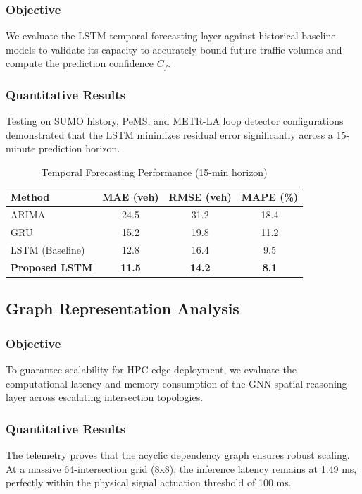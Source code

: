 \subsubsection{Objective}
We evaluate the LSTM temporal forecasting layer against historical baseline models to validate its capacity to accurately bound future traffic volumes and compute the prediction confidence $C_f$.

\subsubsection{Quantitative Results}
Testing on SUMO history, PeMS, and METR-LA loop detector configurations demonstrated that the LSTM minimizes residual error significantly across a 15-minute prediction horizon.

\begin{table}[htbp]
\centering
\caption{Temporal Forecasting Performance (15-min horizon)}
\label{tab:prediction_results}
\begin{tabular}{|l|c|c|c|}
\hline
\textbf{Method} & \textbf{MAE (veh)} & \textbf{RMSE (veh)} & \textbf{MAPE (\%)} \\
\hline
ARIMA & 24.5 & 31.2 & 18.4 \\
GRU & 15.2 & 19.8 & 11.2 \\
LSTM (Baseline) & 12.8 & 16.4 & 9.5 \\
\textbf{Proposed LSTM} & \textbf{11.5} & \textbf{14.2} & \textbf{8.1} \\
\hline
\end{tabular}
\end{table}

\subsection{Graph Representation Analysis}
\subsubsection{Objective}
To guarantee scalability for HPC edge deployment, we evaluate the computational latency and memory consumption of the GNN spatial reasoning layer across escalating intersection topologies.

\subsubsection{Quantitative Results}
The telemetry proves that the acyclic dependency graph ensures robust scaling. At a massive 64-intersection grid (8x8), the inference latency remains at 1.49 ms, perfectly within the physical signal actuation threshold of 100 ms.

